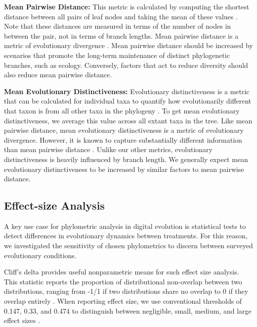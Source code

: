 \textbf{Mean Pairwise Distance:}
This metric is calculated by computing the shortest distance between all pairs of leaf nodes and taking the mean of these values \citep{webbExploringPhylogeneticStructure2000}.
Note that these distances are measured in terms of the number of nodes in between the pair, not in terms of branch lengths.
Mean pairwise distance is a metric of evolutionary divergence \citep{tuckerGuidePhylogeneticMetrics2017}.
Mean pairwise distance should be increased by scenarios that promote the long-term maintenance of distinct phylogenetic branches, such as ecology.
Conversely, factors that act to reduce diversity should also reduce mean pairwise distance.

\textbf{Mean Evolutionary Distinctiveness:}
Evolutionary distinctiveness is a metric that can be calculated for individual taxa to quantify how evolutionarily different that taxon is from all other taxa in the phylogeny \citep{isaacMammalsEDGEConservation2007}.
To get mean evolutionary distinctiveness, we average this value across all extant taxa in the tree.
Like mean pairwise distance, mean evolutionary distinctiveness is a metric of evolutionary divergence.
However, it is known to capture substantially different information than mean pairwise distance \citep{tuckerGuidePhylogeneticMetrics2017}.
Unlike our other metrics, evolutionary distinctiveness is heavily influenced by branch length.
We generally expect mean evolutionary distinctiveness to be increased by similar factors to mean pairwise distance.

\subsection{Effect-size Analysis}
\label{sec:effect-size-analysis}

A key use case for phylometric analysis in digital evolution is statistical tests to detect differences in evolutionary dynamics between treatments.
For this reason, we investigated the sensitivity of chosen phylometrics to discern between surveyed evolutionary conditions.

Cliff's delta provides useful nonparametric means for such effect size analysis.
This statistic reports the proportion of distributional non-overlap between two distributions, ranging from -1/1 if two distributions share no overlap to 0 if they overlap entirely \citep{meissel2024using,cliff1993dominance}.
When reporting effect size, we use conventional thresholds of 0.147, 0.33, and 0.474 to distinguish between negligible, small, medium, and large effect sizes \citep{hess2004robust}.

